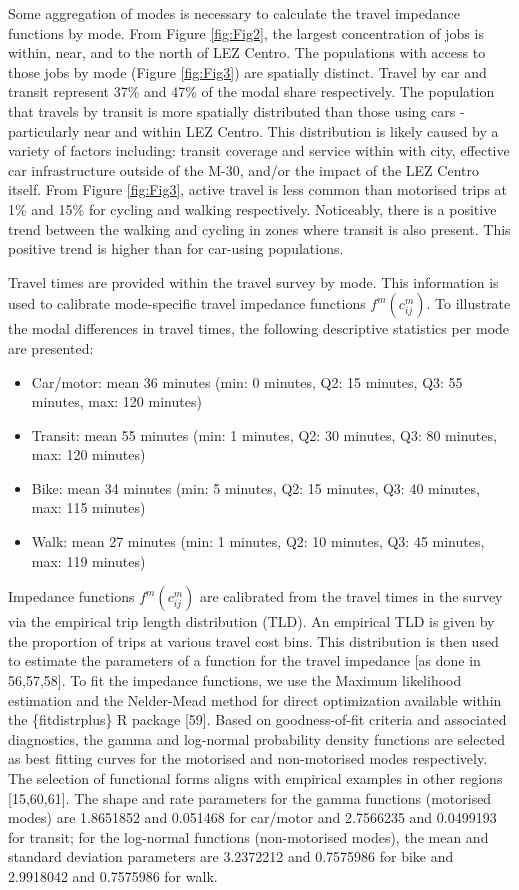 \documentclass[10pt,letterpaper]{article}
\providecommand{\tightlist}{%
  \setlength{\itemsep}{0pt}\setlength{\parskip}{0pt}}
\begin{document}
Some aggregation of modes is necessary to calculate the travel impedance
functions by mode. From Figure \ref{fig:Fig2}, the largest concentration
of jobs is within, near, and to the north of LEZ Centro. The populations
with access to those jobs by mode (Figure \ref{fig:Fig3}) are spatially
distinct. Travel by car and transit represent 37\% and 47\% of the modal
share respectively. The population that travels by transit is more
spatially distributed than those using cars - particularly near and
within LEZ Centro. This distribution is likely caused by a variety of
factors including: transit coverage and service within with city,
effective car infrastructure outside of the M-30, and/or the impact of
the LEZ Centro itself. From Figure \ref{fig:Fig3}, active travel is less
common than motorised trips at 1\% and 15\% for cycling and walking
respectively. Noticeably, there is a positive trend between the walking
and cycling in zones where transit is also present. This positive trend
is higher than for car-using populations.

Travel times are provided within the travel survey by mode. This
information is used to calibrate mode-specific travel impedance
functions \(f^m(c_{ij}^m)\). To illustrate the modal differences in
travel times, the following descriptive statistics per mode are
presented:

\begin{itemize}
\tightlist
\item
  Car/motor: mean 36 minutes (min: 0 minutes, Q2: 15 minutes, Q3: 55
  minutes, max: 120 minutes)
\item
  Transit: mean 55 minutes (min: 1 minutes, Q2: 30 minutes, Q3: 80
  minutes, max: 120 minutes)
\item
  Bike: mean 34 minutes (min: 5 minutes, Q2: 15 minutes, Q3: 40 minutes,
  max: 115 minutes)
\item
  Walk: mean 27 minutes (min: 1 minutes, Q2: 10 minutes, Q3: 45 minutes,
  max: 119 minutes)
\end{itemize}

Impedance functions \(f^m(c_{ij}^m)\) are calibrated from the travel
times in the survey via the empirical trip length distribution (TLD). An
empirical TLD is given by the proportion of trips at various travel cost
bins. This distribution is then used to estimate the parameters of a
function for the travel impedance {[}as done in 56,57,58{]}. To fit the
impedance functions, we use the Maximum likelihood estimation and the
Nelder-Mead method for direct optimization available within the
\{fitdistrplus\} R package {[}59{]}. Based on goodness-of-fit criteria
and associated diagnostics, the gamma and log-normal probability density
functions are selected as best fitting curves for the motorised and
non-motorised modes respectively. The selection of functional forms
aligns with empirical examples in other regions {[}15,60,61{]}. The
shape and rate parameters for the gamma functions (motorised modes) are
1.8651852 and 0.051468 for car/motor and 2.7566235 and 0.0499193 for
transit; for the log-normal functions (non-motorised modes), the mean
and standard deviation parameters are 3.2372212 and 0.7575986 for bike
and 2.9918042 and 0.7575986 for walk.
\end{document}
